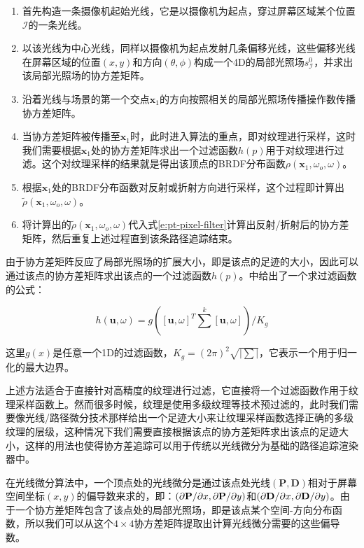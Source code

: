 \begin{enumerate}
	\item 首先构造一条摄像机起始光线，它是以摄像机为起点，穿过屏幕区域某个位置$\mathcal{I}$的一条光线。
	\item 以该光线为中心光线，同样以摄像机为起点发射几条偏移光线，这些偏移光线在屏幕区域的位置$(x,y)$和方向$(\theta,\phi)$构成一个4D的局部光照场$s^{0}_{\mathcal{I}}$，并求出该局部光照场的协方差矩阵。
	\item 沿着光线与场景的第一个交点$\mathbf{x}_1$的方向按照相关的局部光照场传播操作数传播协方差矩阵。
	\item 当协方差矩阵被传播至$\mathbf{x}_1$时，此时进入算法的重点，即对纹理进行采样，这时我们需要根据$\mathbf{x}_1$处的协方差矩阵求出一个过滤函数$h(p)$用于对纹理进行过滤。这个对纹理采样的结果就是得出该顶点的BRDF分布函数$\rho(\mathbf{x}_1,\omega_o,\omega)$。
	\item 根据$\mathbf{x}_1$处的BRDF分布函数对反射或折射方向进行采样，这个过程即计算出$\tilde{\rho}(\mathbf{x}_1,\omega_o,\omega)$。
	\item 将计算出的$\tilde{\rho}(\mathbf{x}_1,\omega_o,\omega)$代入式\ref{e:pt-pixel-filter}计算出反射/折射后的协方差矩阵，然后重复上述过程直到该条路径追踪结束。
\end{enumerate}

由于协方差矩阵反应了局部光照场的扩展大小，即是该点的足迹的大小，因此可以通过该点的协方差矩阵求出该点的一个过滤函数$h(p)$。\cite{a:AntialiasingComplexGlobalIlluminationEffectsinPath-space}中给出了一个求过滤函数的公式：

\begin{equation}
	h(\mathbf{u},\omega)=g([\mathbf{u},\omega]^{T}\sum^{k}[\mathbf{u},\omega])/K_g
\end{equation}

\noindent 这里$g(x)$是任意一个1D的过滤函数，$K_g=(2\pi)^2 \sqrt{|\sum|}$，它表示一个用于归一化的最大边界。

上述方法适合于直接针对高精度的纹理进行过滤，它直接将一个过滤函数作用于纹理采样函数上。然而很多时候，纹理是使用多级纹理等技术预过滤的，此时我们需要像光线/路径微分技术那样给出一个足迹大小来让纹理采样函数选择正确的多级纹理的层级，这种情况下我们需要直接根据该点的协方差矩阵求出该点的足迹大小，这样的用法也使得协方差追踪可以用于传统以光线微分为基础的路径追踪渲染器中。

在光线微分算法中，一个顶点处的光线微分是通过该点处光线$(\mathbf{P},\mathbf{D})$相对于屏幕空间坐标$(x,y)$的偏导数来求的，即：$({\rm \partial}\mathbf{P}/{\rm \partial} x,{\rm \partial}\mathbf{P}/{\rm \partial} y)$和$({\rm \partial}\mathbf{D}/{\rm \partial} x,{\rm \partial}\mathbf{D}/{\rm \partial} y)$。由于一个协方差矩阵包含了该点处的局部光照场，即是该点某个空间-方向分布函数，所以我们可以从这个$4\times 4$协方差矩阵提取出计算光线微分需要的这些偏导数。

